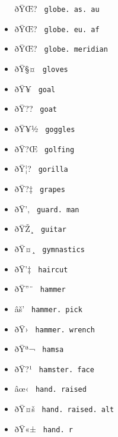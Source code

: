 \begin{itemize}
  \label{symbol-globe.as.au}{{ ðŸŒ? }
  \texttt{\ globe.\ as.\ au\ }}
\item
  \label{symbol-globe.eu.af}{{ ðŸŒ? }
  \texttt{\ globe.\ eu.\ af\ }}
\item
  \label{symbol-globe.meridian}{{ ðŸŒ? }
  \texttt{\ globe.\ meridian\ }}
\item
  \label{symbol-gloves}{{ ðŸ§¤ } \texttt{\ gloves\ }}
\item
  \label{symbol-goal}{{ ðŸ¥ } \texttt{\ goal\ }}
\item
  \label{symbol-goat}{{ ðŸ?? } \texttt{\ goat\ }}
\item
  \label{symbol-goggles}{{ ðŸ¥½ } \texttt{\ goggles\ }}
\item
  \label{symbol-golfing}{{ ðŸ?Œ } \texttt{\ golfing\ }}
\item
  \label{symbol-gorilla}{{ ðŸ¦? } \texttt{\ gorilla\ }}
\item
  \label{symbol-grapes}{{ ðŸ?‡ } \texttt{\ grapes\ }}
\item
  \label{symbol-guard.man}{{ ðŸ'‚ }
  \texttt{\ guard.\ man\ }}
\item
  \label{symbol-guitar}{{ ðŸŽ¸ } \texttt{\ guitar\ }}
\item
  \label{symbol-gymnastics}{{ ðŸ¤¸ }
  \texttt{\ gymnastics\ }}
\item
  \label{symbol-haircut}{{ ðŸ'‡ } \texttt{\ haircut\ }}
\item
  \label{symbol-hammer}{{ ðŸ''¨ } \texttt{\ hammer\ }}
\item
  \label{symbol-hammer.pick}{{ âš' }
  \texttt{\ hammer.\ pick\ }}
\item
  \label{symbol-hammer.wrench}{{ ðŸ› }
  \texttt{\ hammer.\ wrench\ }}
\item
  \label{symbol-hamsa}{{ ðŸª¬ } \texttt{\ hamsa\ }}
\item
  \label{symbol-hamster.face}{{ ðŸ?¹ }
  \texttt{\ hamster.\ face\ }}
\item
  \label{symbol-hand.raised}{{ âœ‹ }
  \texttt{\ hand.\ raised\ }}
\item
  \label{symbol-hand.raised.alt}{{ ðŸ¤š }
  \texttt{\ hand.\ raised.\ alt\ }}
\item
  \label{symbol-hand.r}{{ ðŸ«± } \texttt{\ hand.\ r\ }}

\end{itemize}
